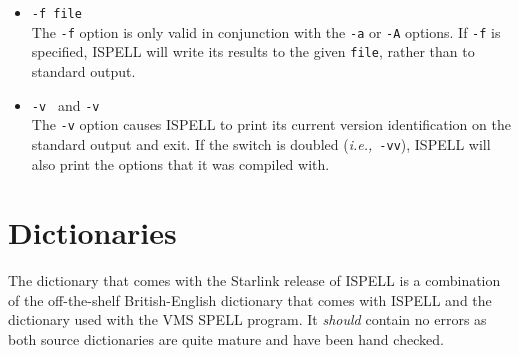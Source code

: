 \documentclass[twoside,11pt]{article}
\begin{document}
\begin{itemize}
To summarize these:

\begin{itemize}

   \item \verb+*+ Add to personal dictionary.
   \item \verb+@+ Accept word, but leave out of dictionary.
   \item \verb+#+ Save current personal dictionary.
   \item \verb+~+ Set parameters based on filename.
   \item \verb=+= Enter \TeX\ mode.
   \item \verb+-+ Exit \TeX\ mode.
   \item \verb+!+ Enter terse mode.
   \item \verb+%+ Exit terse mode.
   \item \verb+^+ Spell-check rest of line.

\end{itemize}

In terse mode, ISPELL will not print lines beginning with \verb-*+-, or
\verb+-+, all of which indicate correct words.
This significantly improves running speed when the driving program is going to
ignore correct words anyway.

\item {\Large\tt -f file} \\
The \verb+-f+ option is only valid in conjunction with the \verb+-a+ or
\verb+-A+ options.
If \verb+-f+ is specified, ISPELL will write its results to the given
\verb+file+, rather than to standard output.

\item {\Large\tt -v } and {\Large\tt -v } \\
The \verb+-v+ option causes ISPELL to print its current version identification
on the standard output and exit.
If the switch is doubled ({\it{i.e.,}}\ \verb+-vv+), ISPELL will also print the
options that it was compiled with.

\end{itemize}

\section{Dictionaries}

The dictionary that comes with the Starlink release of ISPELL is a combination
of the off-the-shelf British-English dictionary that comes with ISPELL and the
dictionary used with the VMS SPELL program.  It {\em should} contain no errors
as both source dictionaries are quite mature and have been hand checked.
\end{document}
